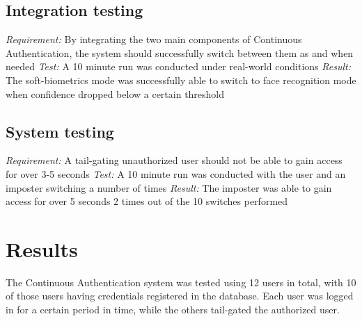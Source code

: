 \documentclass[12pt]{article}			%
\begin{document}
\subsection{ Integration testing}
\emph{ Requirement: } By integrating the two main components of Continuous Authentication, the system should successfully switch between them as and when needed
\emph{ Test: } A 10 minute run was conducted under real-world conditions
\emph{ Result: } The soft-biometrics mode was successfully able to switch to face recognition mode when confidence dropped below a certain threshold

\subsection{ System testing }
\emph{ Requirement: } A tail-gating unauthorized user should not be able to gain access for over 3-5 seconds
\emph{ Test: } A 10 minute run was conducted with the user and an imposter switching a number of times
\emph{ Result: } The imposter was able to gain access for over 5 seconds 2 times out of the 10 switches performed

\section{ Results }
The Continuous Authentication system was tested using 12 users in total, with 10 of those users having credentials registered in the database. Each user was logged in for a certain period in time, while the others tail-gated the authorized user. 
\end{document}
